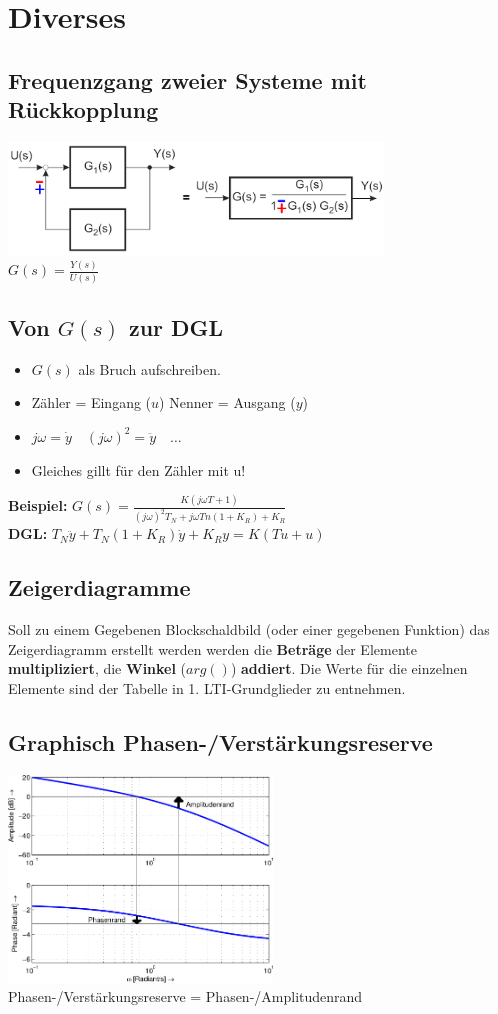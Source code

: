 \section{Diverses}
	\subsection{Frequenzgang zweier Systeme mit Rückkopplung }
		\begin{center}
    		\includegraphics[height=3cm]{./bilder/feedback.png} \\
    		$G(s) = \frac{Y(s)}{U(s)}$
        \end{center}
    
    \subsection{Von $G(s)$ zur DGL}
    	\begin{multicols}{2}
    		\begin{itemize}
  				\item $G(s)$ als Bruch aufschreiben.
  				\item Zähler = Eingang ($u$) \quad Nenner = Ausgang ($y$)
  				\item $j\omega = \dot{y} \quad (j\omega)^2 = \ddot{y} \quad \ldots $
  				\item Gleiches gillt für den Zähler mit u!
			\end{itemize}
			\columnbreak
			\textbf{Beispiel:} $G(s) = \frac{K(j \omega T + 1)}{(j\omega)^2 T_N + j \omega Tn(1+K_R) + K_R}$ \\			
			\textbf{DGL:} $T_N \ddot{y} + T_N(1+K_R) \dot{y} + K_R y = K(T \dot{u} + u)$
    	\end{multicols}    	
    
    \subsection{Zeigerdiagramme}
    Soll zu einem Gegebenen Blockschaldbild (oder einer gegebenen Funktion) das Zeigerdiagramm erstellt 
    werden werden die \textbf{Beträge} der Elemente \textbf{multipliziert},
    die \textbf{Winkel} ($arg()$) \textbf{addiert}. Die Werte für die einzelnen Elemente sind der Tabelle in 1. LTI-Grundglieder zu entnehmen. 


	\subsection{Graphisch Phasen-/Verstärkungsreserve}
		\includegraphics[width=7cm]{./bilder/bode-stabilitaet.png} \\
		Phasen-/Verstärkungsreserve = Phasen-/Amplitudenrand
		